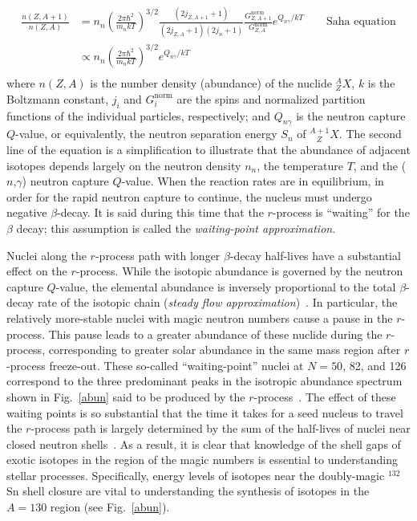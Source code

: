 \begin{equation}
\begin{split}
\frac{n(Z,A+1)}{n(Z,A)}&=n_n \left(\frac{2\pi \hbar^2}{m_nkT}\right)^{3/2} \frac{(2j_{Z,A+1}+1)}{(2j_{Z,A}+1)(2j_n+1)}\frac{G^\mathrm{norm}_{Z,A+1}}{G^\mathrm{norm}_{Z,A}}e^{Q_{n\gamma}/kT} \qquad \textrm{Saha equation}\\
& \propto n_n \left(\frac{2\pi \hbar^2}{m_nkT}\right)^{3/2} e^{Q_{n\gamma}/kT}\\
\end{split}
\label{eq:saha}
\end{equation}
where $n(Z,A)$ is the number density (abundance) of the nuclide $^A_ZX$, $k$ is the Boltzmann constant, $j_i$ and $G^\mathrm{norm}_{i}$ are the spins and normalized partition functions of the individual particles, respectively; and $Q_{n\gamma}$ is the neutron capture $Q$-value, or equivalently, the neutron separation energy $S_n$ of $^{A+1}_{~~~~Z}X$.
The second line of the equation is a simplification to illustrate that the abundance of adjacent isotopes depends largely on the neutron density $n_n$, the temperature $T$, and the ($n$,$\gamma$) neutron capture $Q$-value.
When the reaction rates are in equilibrium, in order for the rapid neutron capture to continue, the nucleus must undergo negative $\beta$-decay.  It is said during this time that the $r$-process is ``waiting'' for the $\beta$ decay; this assumption is called the \textit{waiting-point approximation}.

Nuclei along the $r$-process path with longer $\beta$-decay half-lives have a substantial effect on the $r$-process.  While the isotopic abundance is governed by the neutron capture $Q$-value, the elemental abundance is inversely proportional to the total $\beta$-decay rate of the isotopic chain (\textit{steady flow approximation})~\cite{Iliadis_2007}. In particular, the relatively more-stable nuclei with magic neutron numbers cause a pause in the $r$-process.  This pause leads to a greater abundance of these nuclide during the 
$r$-process, corresponding to greater solar abundance in the same mass region after $r$-process freeze-out.
These so-called ``waiting-point'' nuclei at $N=50$, 82, and 126 correspond to the three predominant peaks in the isotropic abundance spectrum shown in Fig.~\ref{abun} said to be produced by the $r$-process~\cite{Kratz_1993}.   The effect of these waiting points is so substantial that the time it takes for a seed nucleus to travel the $r$-process path is largely determined by the sum of the half-lives of nuclei near closed neutron shells~\cite{Martinez-Pinedo_1999}.  As a result, it is clear that knowledge of the shell gaps of exotic isotopes in the region of the magic numbers is essential to understanding stellar processes.  Specifically, energy levels of isotopes near the doubly-magic $^{132}$Sn shell closure are vital to understanding the synthesis of isotopes in the $A=130$ region (see Fig.~\ref{abun}).

